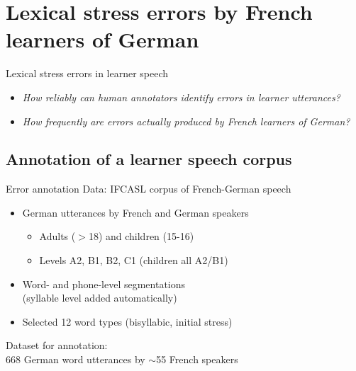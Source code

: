 \documentclass[xcolor={dvipsnames}]{beamer}
\newcommand{\TODO}[1]{{\color{red}\textbf{[TODO #1]}}}
\begin{document}
\section{Lexical stress errors by French learners of German}
		\begin{frame}{Lexical stress errors in learner speech}
		\begin{itemize}
		\item{\textit{How reliably can human annotators identify errors in learner utterances?}}
		\vspace{1em}
		\item{\textit{How frequently are  errors actually produced by French learners of German?}}
		\end{itemize}
		

		\end{frame}
		
	\subsection{Annotation of a learner speech corpus}
		\begin{frame}{Error annotation}
		Data: IFCASL corpus of French-German speech
		\begin{itemize}
			\item{German utterances by French and German speakers
				\begin{itemize}
				\item Adults ($>$18) and children (15-16)
				\item Levels A2, B1, B2, C1 (children all A2/B1)
				\end{itemize}
			}
			\item{Word- and phone-level segmentations\\(syllable level added automatically)}
			\item{Selected 12 word types (bisyllabic, initial stress)}

		\end{itemize}
		
		\vfill
		Dataset for annotation:\\
		\hspace*{20pt} 668 German word utterances by $\sim$55 French speakers
		\end{frame}
		
\end{document}
